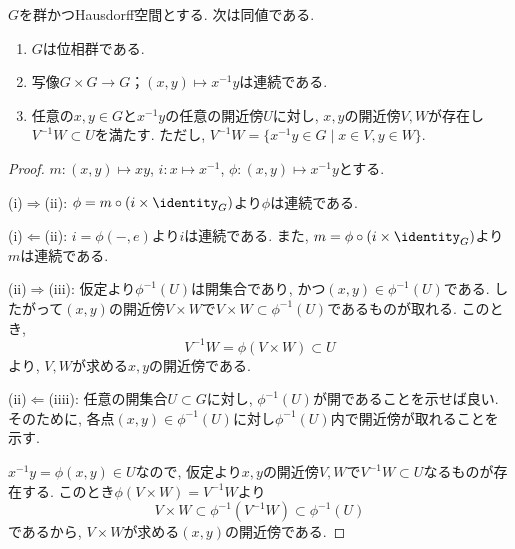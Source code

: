 
    \begin{definition}[位相群]
        
    \end{definition}

    \begin{proposition}
        $G$を群かつHausdorff空間とする.
        次は同値である.
        \begin{enumerate}
            \item $G$は位相群である.
            \item 写像$G\times G \to G ； (x, y)\mapsto x^{-1}y$は連続である.
            \item 任意の$x,y\in G$と$x^{-1}y$の任意の開近傍$U$に対し,
            $x, y$の開近傍$V, W$が存在し$V^{-1}W\subset U$を満たす.
            ただし, $V^{-1}W= \{x^{-1}y\in G \mid x\in V, y\in W \}$.
        \end{enumerate}
    \end{proposition}

    \begin{proof}
        $m\colon (x,y)\mapsto xy$,
        $i\colon x\mapsto x^{-1}$,
        $\phi\colon (x,y)\mapsto x^{-1}y$とする.

        (i)$\Rightarrow$(ii):
        $\phi= m\circ (i\times \identity_G)$より$\phi$は連続である.

        (i)$\Leftarrow$(ii):
        $i = \phi(-,e)$より$i$は連続である.
        また, $m= \phi\circ(i\times\identity_G)$より$m$は連続である.

        (ii)$\Rightarrow$(iii):
        仮定より$\phi^{-1}(U)$は開集合であり, かつ$(x,y)\in \phi^{-1}(U)$である.
        したがって$(x, y)$の開近傍$V\times W$で$V\times W \subset \phi^{-1}(U)$であるものが取れる.
        このとき,
        \[V^{-1}W= \phi(V\times W) \subset U
        \]
        より, $V, W$が求める$x, y$の開近傍である.

        (ii)$\Leftarrow$(iiii):
        任意の開集合$U\subset G$に対し, $\phi^{-1}(U)$が開であることを示せば良い.
        そのために, 各点$(x,y)\in \phi^{-1}(U)$に対し$\phi^{-1}(U)$内で開近傍が取れることを示す.

        $x^{-1}y= \phi(x,y)\in U$なので, 仮定より$x, y$の開近傍$V, W$で$V^{-1}W\subset U$なるものが存在する.
        このとき$\phi(V\times W) = V^{-1}W$より
        \[V\times W \subset \phi^{-1}(V^{-1}W) \subset \phi^{-1}(U)
        \]
        であるから, $V\times W$が求める$(x,y)$の開近傍である.
    \end{proof}

    \begin{proposition}
        
    \end{proposition}

